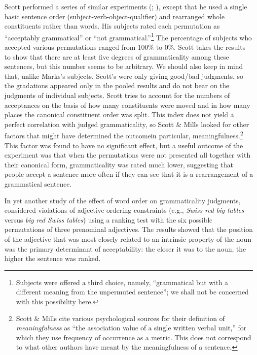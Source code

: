 Scott performed a series of similar experiments (\citealt{Scott1969}; \citealt{ScottEtAl1973}), except that he used a single basic sentence order (subject-verb-object-qualifier) and rearranged whole constituents rather than words. His subjects rated each permutation as ``acceptably grammatical'' or ``not grammatical.''\footnote{Subjects were offered a third choice, namely, ``grammatical but with a different meaning from the unpermuted sentence''; we shall not be concerned with this possibility here.}
The percentage of subjects who accepted various permutations ranged from 100\% to 0\%. Scott takes the results to show that there are at least five degrees of grammaticality among these sentences, but this number seems to be arbitrary. We should also keep in mind that, unlike Marks's subjects, Scott's were only giving good/bad judgments, so the gradations appeared only in the pooled results and do not bear on the judgments of individual subjects. Scott tries to account for the numbers of acceptances on the basis of how many constituents were moved and in how many places the canonical constituent order was split. This index does not yield a perfect correlation with judged grammaticality, so Scott \& Mills looked for other factors that might have determined the outcome\schdash{}in particular, meaningfulness.\footnote{Scott \& Mills cite various psychological sources for their definition of \textit{meaningfulness} as ``the association value of a single written verbal unit,'' for which they use frequency of occurrence as a metric. This does not correspond to what other authors have meant by the meaningfulness of a sentence.}
This factor was found to have no significant effect, but a useful outcome of the experiment was that when the permutations were not presented all together with their canonical form, grammaticality was rated much lower, suggesting that people accept a sentence more often if they can see that it is a rearrangement of a grammatical sentence.

In yet another study of the effect of word order on grammaticality judgments, \citet{DanksEtAl1971} considered violations of adjective ordering constraints (e.g., \textit{Swiss red big tables} versus \textit{big red Swiss tables}) using a ranking test with the six possible permutations of three prenominal adjectives. The results showed that the position of the adjective that was most closely related to an intrinsic property of the noun was the primary determinant of acceptability: the closer it was to the noun, the higher the sentence was ranked.

